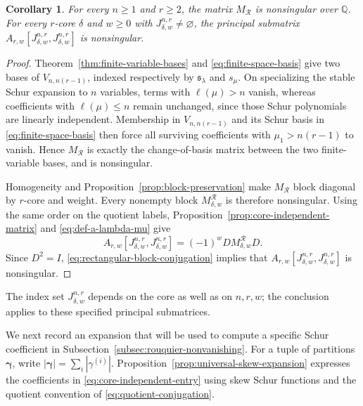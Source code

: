 \documentclass[12pt,reqno,a4paper]{amsart}
\numberwithin{equation}{section}
\numberwithin{figure}{section}
\theoremstyle{plain}
\newtheorem{corollary}[theorem]{Corollary}
\theoremstyle{definition}
\begin{document}
\begin{corollary}\label{cor:rectangular-principal-matrices}
For every $n\geq1$ and $r\geq2$, the matrix $M_{\mathcal R}$ is
nonsingular over $\mathbb Q$.  For every $r$-core $\delta$ and
$w\geq0$ with $J_{\delta,w}^{n,r}\neq\varnothing$, the principal
submatrix
$A_{r,w}[J_{\delta,w}^{n,r},J_{\delta,w}^{n,r}]$ is nonsingular.
\end{corollary}

\begin{proof}
Theorem~\ref{thm:finite-variable-bases} and
\eqref{eq:finite-space-basis} give two bases of $V_{n,n(r-1)}$,
indexed respectively by $\mathfrak s_\lambda$ and $s_\mu$.
On specializing the stable Schur expansion to $n$ variables, terms
with $\ell(\mu)>n$ vanish, whereas coefficients with
$\ell(\mu)\leq n$ remain unchanged, since those Schur polynomials
are linearly independent.  Membership in $V_{n,n(r-1)}$ and its Schur
basis in \eqref{eq:finite-space-basis} then force all surviving coefficients
with $\mu_1>n(r-1)$ to vanish.  Hence $M_{\mathcal R}$ is exactly the
change-of-basis matrix between the two finite-variable bases, and
is nonsingular.

Homogeneity and Proposition~\ref{prop:block-preservation} make
$M_{\mathcal R}$ block diagonal by $r$-core and weight.
Every nonempty block $M_{\delta,w}^{\mathcal R}$ is therefore
nonsingular.  Using the same order on the quotient labels,
Proposition~\ref{prop:core-independent-matrix} and
\eqref{eq:def-a-lambda-mu} give
\begin{equation}\label{eq:rectangular-block-conjugation}
 A_{r,w}[J_{\delta,w}^{n,r},J_{\delta,w}^{n,r}]
       =(-1)^wD M_{\delta,w}^{\mathcal R}D.
\end{equation}
Since $D^2=I$, \eqref{eq:rectangular-block-conjugation} implies that
$A_{r,w}[J_{\delta,w}^{n,r},J_{\delta,w}^{n,r}]$ is nonsingular.
\end{proof}

The index set $J_{\delta,w}^{n,r}$ depends on the core as well as
on $n,r,w$; the conclusion applies to these specified principal
submatrices.

We next record an expansion that will be used to compute a specific
Schur coefficient in Subsection~\ref{subsec:rouquier-nonvanishing}.
For a tuple of partitions $\boldsymbol\gamma$, write
$|\boldsymbol\gamma|=\sum_i|\gamma^{(i)}|$.
Proposition~\ref{prop:universal-skew-expansion} expresses the
coefficients in \eqref{eq:core-independent-entry} using skew Schur
functions and the quotient convention of
\eqref{eq:quotient-conjugation}.
\end{document}
